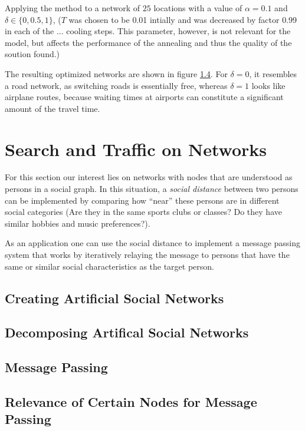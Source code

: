 \documentclass{scrartcl}
\begin{document}
Applying the method to a network of $25$ locations with a value of
$\alpha=0.1$ and $\delta \in \{0, 0.5, 1\}$, ($T$ was chosen to be 0.01
intially and was decreased by factor 0.99 in each of the ... cooling steps.
This parameter, however, is not relevant for the model, but affects the
performance of the annealing and thus the quality of the soution found.)

The resulting optimized networks are shown in figure \ref{}. For
$\delta=0$, it resembles a road network, as switching roads is essentially
free, whereas $\delta=1$ looks like airplane routes, because waiting times
at airports can constitute a significant amount of the travel time.



\clearpage 

\section{Search and Traffic on Networks}
For this section our interest lies on networks with nodes that are
understood as persons in a social graph. In this situation, a \emph{social
distance} between two persons can be implemented by comparing how
\enquote{near} these persons are in different social categories
(Are they in the same sports clubs or classes? Do they have similar hobbies
and music preferences?). 

As an application one can use the social distance
to implement a message passing system that works by iteratively relaying
the message to persons that have the same or similar social characteristics
as the target person.

\subsection{Creating Artificial Social Networks}
\subsection{Decomposing Artifical Social Networks}
\subsection{Message Passing}
\subsection{Relevance of Certain Nodes for Message Passing}
\end{document}
